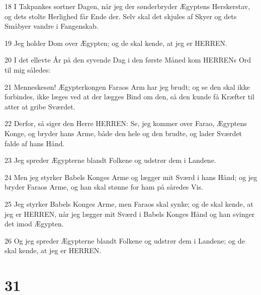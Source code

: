 \par 18 I Takpankes sortner Dagen, når jeg der sønderbryder Ægyptens Herskerstav, og dets stolte Herlighed får Ende der. Selv skal det skjules af Skyer og dets Småbyer vandre i Fangenskab.
\par 19 Jeg holder Dom over Ægypten; og de skal kende, at jeg er HERREN.
\par 20 I det ellevte År på den syvende Dag i den første Måned kom HERRENs Ord til mig således:
\par 21 Menneskesøn! Ægypterkongen Faraos Arm har jeg brudt; og se den skal ikke forbindes, ikke læges ved at der lægges Bind om den, så den kunde få Kræfter til atter at gribe Sværdet.
\par 22 Derfor, så siger den Herre HERREN: Se, jeg kommer over Farao, Ægyptens Konge, og bryder hans Arme, både den hele og den brudte, og lader Sværdet falde af hans Hånd.
\par 23 Jeg spreder Ægypterne blandt Folkene og udstrør dem i Landene.
\par 24 Men jeg styrker Babels Konges Arme og lægger mit Sværd i hans Hånd; og jeg bryder Faraos Arme, og han skal stønne for ham på såredes Vis.
\par 25 Jeg styrker Babels Konges Arme, men Faraos skal synke; og de skal kende, at jeg er HERREN, når jeg lægger mit Sværd i Babels Konges Hånd og han svinger det imod Ægypten.
\par 26 Og jeg spreder Ægypterne blandt Folkene og udstrør dem i Landene; og de skal kende, at jeg er HERREN.

\chapter{31}

